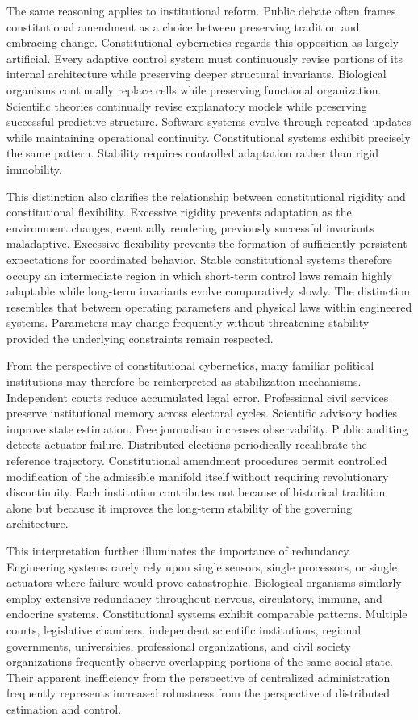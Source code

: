 \documentclass[12pt,a4paper]{article}
\begin{document}
The same reasoning applies to institutional reform. Public debate often frames constitutional amendment as a choice between preserving tradition and embracing change. Constitutional cybernetics regards this opposition as largely artificial. Every adaptive control system must continuously revise portions of its internal architecture while preserving deeper structural invariants. Biological organisms continually replace cells while preserving functional organization. Scientific theories continually revise explanatory models while preserving successful predictive structure. Software systems evolve through repeated updates while maintaining operational continuity. Constitutional systems exhibit precisely the same pattern. Stability requires controlled adaptation rather than rigid immobility.

This distinction also clarifies the relationship between constitutional rigidity and constitutional flexibility. Excessive rigidity prevents adaptation as the environment changes, eventually rendering previously successful invariants maladaptive. Excessive flexibility prevents the formation of sufficiently persistent expectations for coordinated behavior. Stable constitutional systems therefore occupy an intermediate region in which short-term control laws remain highly adaptable while long-term invariants evolve comparatively slowly. The distinction resembles that between operating parameters and physical laws within engineered systems. Parameters may change frequently without threatening stability provided the underlying constraints remain respected.

From the perspective of constitutional cybernetics, many familiar political institutions may therefore be reinterpreted as stabilization mechanisms. Independent courts reduce accumulated legal error. Professional civil services preserve institutional memory across electoral cycles. Scientific advisory bodies improve state estimation. Free journalism increases observability. Public auditing detects actuator failure. Distributed elections periodically recalibrate the reference trajectory. Constitutional amendment procedures permit controlled modification of the admissible manifold itself without requiring revolutionary discontinuity. Each institution contributes not because of historical tradition alone but because it improves the long-term stability of the governing architecture.

This interpretation further illuminates the importance of redundancy. Engineering systems rarely rely upon single sensors, single processors, or single actuators where failure would prove catastrophic. Biological organisms similarly employ extensive redundancy throughout nervous, circulatory, immune, and endocrine systems. Constitutional systems exhibit comparable patterns. Multiple courts, legislative chambers, independent scientific institutions, regional governments, universities, professional organizations, and civil society organizations frequently observe overlapping portions of the same social state. Their apparent inefficiency from the perspective of centralized administration frequently represents increased robustness from the perspective of distributed estimation and control.
\end{document}

